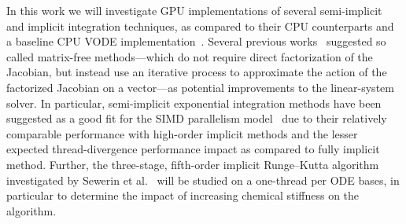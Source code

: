 \documentclass[preprint,12pt]{elsarticle}
\begin{document}
In this work we will investigate GPU implementations of several semi-implicit and implicit integration techniques, as compared to their CPU counterparts and a baseline CPU VODE implementation~\cite{Hindmarsh:2005hg}.
Several previous works~\cite{Stone:2013aa,Bisetti:2012jw,Niemeyer:2014aa,Perini20141180,McNenly2015581} suggested so called matrix-free methods---which do not require direct factorization of the Jacobian, but instead use an iterative process to approximate the action of the factorized Jacobian on a vector---as potential improvements to the linear-system solver.
In particular, semi-implicit exponential integration methods have been suggested as a good fit for the SIMD parallelism model~\cite{Stone:2013aa,Bisetti:2012jw,Niemeyer:2014aa} due to their relatively comparable performance with high-order implicit methods and the lesser expected thread-divergence performance impact as compared to fully implicit method.
Further, the three-stage, fifth-order implicit Runge--Kutta algorithm investigated by Sewerin et al.~\cite{Sewerin20151375} will be studied on a one-thread per ODE bases, in particular to determine the impact of increasing chemical stiffness on the algorithm.



\pagebreak



\end{document}
